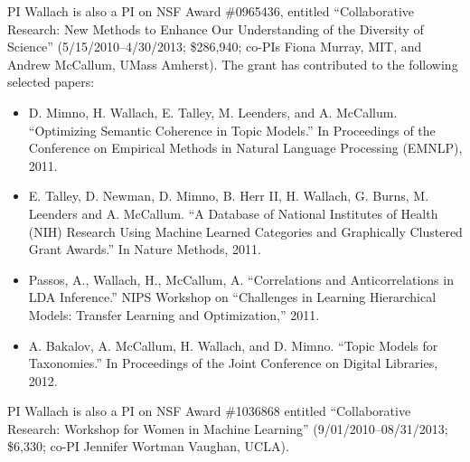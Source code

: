 

PI Wallach is also a PI on NSF Award \#0965436, entitled
``Collaborative Research: New Methods to Enhance Our Understanding of
the Diversity of Science'' (5/15/2010--4/30/2013; \$286,940; co-PIs
Fiona Murray, MIT, and Andrew McCallum, UMass Amherst). The grant has
contributed to the following selected papers:

\begin{itemize}

\item D. Mimno, H. Wallach, E. Talley, M. Leenders, and
  A. McCallum. ``Optimizing Semantic Coherence in Topic Models.'' In
  Proceedings of the Conference on Empirical Methods in Natural
  Language Processing (EMNLP), 2011.

\item E. Talley, D. Newman, D. Mimno, B. Herr II, H. Wallach,
  G. Burns, M. Leenders and A. McCallum. ``A Database of National
  Institutes of Health (NIH) Research Using Machine Learned Categories
  and Graphically Clustered Grant Awards.'' In Nature Methods, 2011.

\item Passos, A., Wallach, H., McCallum, A. ``Correlations and
  Anticorrelations in LDA Inference.'' NIPS Workshop on ``Challenges
  in Learning Hierarchical Models: Transfer Learning and
  Optimization,'' 2011.

\item A. Bakalov, A. McCallum, H. Wallach, and D. Mimno. ``Topic
  Models for Taxonomies.'' In Proceedings of the Joint Conference on
  Digital Libraries, 2012.

\end{itemize}

PI Wallach is also a PI on NSF Award \#1036868 entitled
``Collaborative Research: Workshop for Women in Machine Learning''
(9/01/2010--08/31/2013; \$6,330; co-PI Jennifer Wortman Vaughan,
UCLA).

